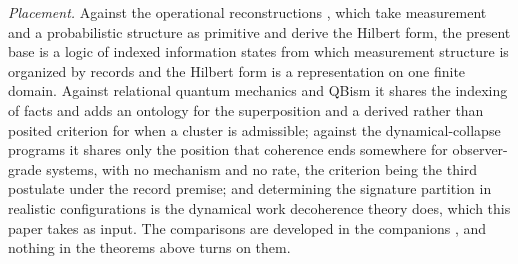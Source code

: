 \emph{Placement.} Against the operational reconstructions \cite{hardy2001, cbh2003, cdp2011, masanesmuller2011}, which take measurement and a probabilistic structure as primitive and derive the Hilbert form, the present base is a logic of indexed information states from which measurement structure is organized by records and the Hilbert form is a representation on one finite domain. Against relational quantum mechanics and QBism it shares the indexing of facts and adds an ontology for the superposition and a derived rather than posited criterion for when a cluster is admissible; against the dynamical-collapse programs it shares only the position that coherence ends somewhere for observer-grade systems, with no mechanism and no rate, the criterion being the third postulate under the record premise; and determining the signature partition in realistic configurations is the dynamical work decoherence theory does, which this paper takes as input. The comparisons are developed in the companions \cite{Aethus, AethusBrief}, and nothing in the theorems above turns on them.





